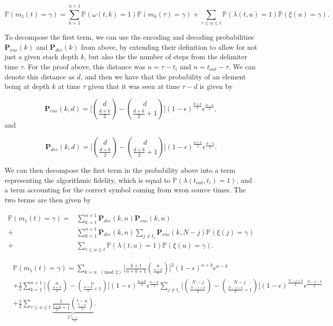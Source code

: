 \documentclass{article}
\newcommand{\eps}{\epsilon}
\begin{document}
$$
\mathbb{P}(m_1(t) = \gamma) = \sum_{k=1}^{n+1}\mathbb{P}(\omega(t,k) = 1)\mathbb{P}(m_k(\tau)=\gamma) + \sum_{\tau \leq u \leq t}\mathbb{P}(\lambda(t,u) = 1)\mathbb{P}(\xi(u) = \gamma).
$$

To decompose the first term, we can use the encoding and decoding probabilities $\mathbf{P}_{enc}(k)$ and $\mathbf{P}_{dec}(k)$ from above, by extending their definition to allow for not just a given stack depth $k$, but also the the number of steps from the delimiter time $\tau$. For the proof above, this distance was $n= \tau-t_i$ and $n = t_{out}-\tau$. We can denote this distance as $d$, and then we have that the probability of an element being at depth $k$ at time $\tau$ given that it was seen at time $\tau-d$ is given by

$$
\mathbf{P}_{enc}(k,d) = \bigg[\binom{d}{\frac{d+k}{2}} - \binom{d}{\frac{d+k}{2}+1}\bigg] (1- \eps)^{\frac{d + k}{2}} \eps^{\frac{d-k}{2}},
$$
and 

$$
\mathbf{P}_{dec}(k, d) = \bigg[\binom{d}{\frac{d+k}{2}} - \binom{d}{\frac{d+k}{2}+1}\bigg] (1- \eps)^{\frac{d + k}{2}} \eps^{\frac{d-k}{2}}.
$$

We can then decompose the first term in the probability above into a term representing the algorithmic fidelity, which is equal to $\mathbb{P}(\lambda(t_{out},t_{i}) = 1)$, and a term accounting for the correct symbol coming from wron source times. The two terms are then given by

\begin{align*}
\mathbb{P}(m_1(t) = \gamma) = &\sum_{k=1}^{n+1} \mathbf{P}_{dec}(k, n) \mathbf{P}_{enc}(k, n) \\ 
+ &\sum_{k=1}^{n+1} \mathbf{P}_{dec}(k, n) \sum_{j \neq t_i} \mathbf{P}_{enc}(k, N-j) \mathbb{P}(\xi(j) = \gamma) \\ 
+ &\sum_{\tau \leq u \leq t}\mathbb{P}(\lambda(t,u) = 1)\mathbb{P}(\xi(u) = \gamma).
\end{align*}


\begin{align*}
&\mathbb{P}(m_1(t) = \gamma) = \sum_{k = n \text{ }(\text{mod }2)} \bigg[\frac{k+1}{n+k+1}\binom{n}{\frac{n+k}{2}}\bigg]^2 (1- \eps)^{n + k} \eps^{n-k} \\ 
&+ \frac{1}{2} \sum_{k=1}^{n+1}  \bigg[\binom{n}{\frac{n+k}{2}} - \binom{n}{\frac{n+k}{2}+1}\bigg] (1- \eps)^{\frac{n + k}{2}} \eps^{\frac{n-k}{2}}\sum_{j \neq t_i} \bigg[\binom{N-j}{\frac{N-j+k}{2}} - \binom{N-j}{\frac{N-j+k}{2}+1}\bigg] (1- \eps)^{\frac{N-j + k}{2}} \eps^{\frac{N-j-k}{2}} \\ 
&+ \frac{1}{2} \sum_{\tau \leq u \leq t}\underbrace{\frac{1}{\frac{t-u}{2} + 1} \binom{t-u}{\frac{t-u}{2}}}_{C_{\frac{t-u}{2}}}.
\end{align*}
\end{document}
